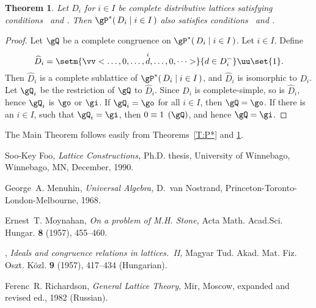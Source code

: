 \documentclass{amsart}
\theoremstyle{plain}
\newtheorem{theorem}{Theorem}
\theoremstyle{definition}
\theoremstyle{remark}
\numberwithin{equation}{section}
\newcommand{\Prodsm}[2]{\gP^{*}(\,#1\mid#2\,)}
\newcommand{\vct}[2]{\vv<\dots,0,\dots,\overset{#1}{#2},%
\dots,0,\dots>}%
\begin{document}
\begin{theorem}\label{T:P*a}  
   Let $D_{i}$ for $i \in I$ be complete distributive 
   lattices satisfying
   conditions~ and .  Then 
   $\Prodsm{ D_{i} }{i \in I}$ also satisfies 
   conditions~ and .  
\end{theorem}

\begin{proof}
   Let $\gQ$ be a complete congruence on 
   $\Prodsm{ D_{i} }{i \in I}$. Let $i \in I$.  Define 
   \begin{equation}\label{E:dihat}
      \widehat{D}_{i} = \setm{ \vct{i}{d} }{ d \in D_{i}^{-} } 
       \uu \set{1}.
   \end{equation}
   Then $\widehat{D}_{i}$ is a complete sublattice of 
   $\Prodsm{ D_{i} }{i \in I}$, and $\widehat{D}_{i}$  
   is isomorphic to $D_{i}$.  Let $\gQ_{i}$ be the 
   restriction of $\gQ$ to $\widehat{D}_{i}$.  Since
   $D_{i}$ is complete-simple, so is $\widehat{D}_{i}$,
   hence $\gQ_{i}$ is $\go$ or $\gi$.  If $\gQ_{i} = \go$ 
   for all $i \in I$, then $\gQ = \go$.  
   If there is an $i \in I$, such that $\gQ_{i} = \gi$, 
   then $0 \equiv 1 \pod{\gQ}$, and hence $\gQ = \gi$.  
\end{proof}

The Main Theorem follows easily from Theorems~\ref{T:P*} and 
\ref{T:P*a}.

\begin{thebibliography}{9}

      Soo-Key Foo, \emph{Lattice Constructions,} Ph.D. thesis, University 
      of Winnebago, Winnebago, MN, December, 1990.

      George~A. Menuhin, \emph{Universal Algebra,} D.~van Nostrand,
      Princeton-Toronto-London-Mel\-bourne, 1968.

      Ernest~T. Moynahan, \emph{On a problem of M.H. Stone,} Acta Math.
       Acad.Sci. Hungar. \textbf{8} (1957), 455--460.

      \bysame, \emph{Ideals and congruence relations in lattices.~II,}
     Magyar Tud. Akad. Mat. Fiz. Oszt. K\"{o}zl. \textbf{9} (1957), 
     417--434  (Hungarian).

      Ferenc~R. Richardson, \emph{General Lattice Theory,} Mir, Moscow, 
      expanded and revised ed., 1982 (Russian).

\end{thebibliography}
\end{document}
